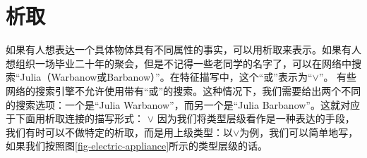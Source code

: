\section{析取}

如果有人想表达一个具体物体具有不同属性的事实，可以用析取来表示。如果有人想组织一场毕业二十年的聚会，但是不记得一些老同学的名字了，可以在网络中搜索“Julia（Warbanow或Barbanow）”。在特征描写中，这个“或”表示为“$\vee$”。
\ea
\ms[人]{
名  & julia\\
姓  & warbanow $\vee$ barbanow
}
\z
有些网络的搜索引擎不允许使用带有“或”的搜索。这种情况下，我们需要给出两个不同的搜索选项：一个是“Julia Warbanow”，而另一个是“Julia Barbanow”。这就对应于下面用析取连接的描写形式：
\ea
\ms[人]{
名  & julia\\
姓  & warbanow
} $\vee $
\ms[人]{
名  & julia\\
姓  & barbanow
}
\z
因为我们将类型层级看作是一种表达的手段，我们有时可以不做特定的析取，而是用上级类型：以$\vee$为例，我们可以简单地写，如果我们按照图\vref{fig-electric-appliance}所示的类型层级的话。

